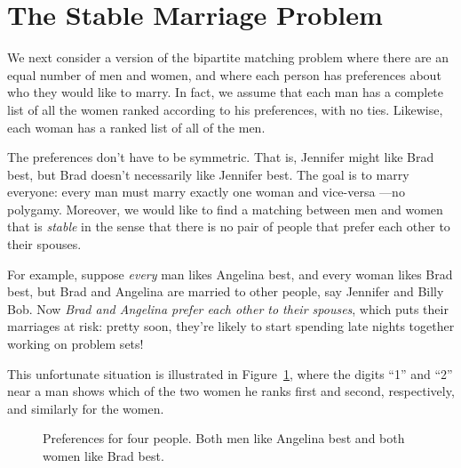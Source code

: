
\begin{problems}
\classproblems
{}

\examproblems
{}

\homeworkproblems
{}
\end{problems}


\section{The Stable Marriage Problem}
\label{stablemarriagesec}

We next consider a version of the bipartite matching problem where
there are an equal number of men and women, and where each person has
preferences about who they would like to marry.  In fact, we assume
that each man has a complete list of all the women ranked according
to his preferences, with no ties.  Likewise, each woman has a ranked
list of all of the men.

The preferences don't have to be symmetric.  That is, Jennifer might
like Brad best, but Brad doesn't necessarily like Jennifer best.  The
goal is to marry everyone: every man must marry exactly one woman and
vice-versa ---no polygamy.  Moreover, we would like to find a matching
between men and women that is \emph{stable} in the sense that there is
no pair of people that prefer each other to their spouses.

For example, suppose \emph{every} man likes Angelina best, and every
woman likes Brad best, but Brad and Angelina are married to other
people, say Jennifer and Billy Bob.  Now \emph{Brad and Angelina
  prefer each other to their spouses}, which puts their marriages at
risk: pretty soon, they're likely to start spending late nights
together working on problem sets!

This unfortunate situation is illustrated in
Figure~\ref{fig:minWtMatch2}, where the digits ``1'' and ``2'' near a
man shows which of the two women he ranks first and second,
respectively, and similarly for the women.

\begin{figure}


\caption{Preferences for four people.  Both men like Angelina best and
both women like Brad best.}
\label{fig:minWtMatch2}
\end{figure}

